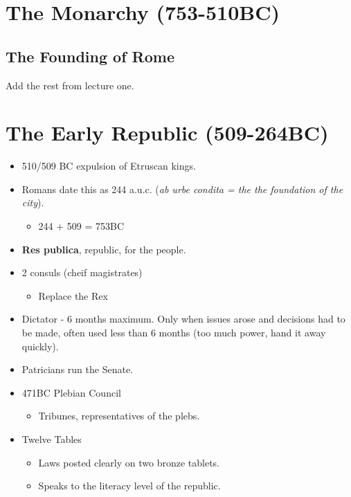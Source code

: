 \documentclass[12pt, twoside]{article}
\begin{document}
\section{The Monarchy (753-510BC)}
\subsection{The Founding of Rome}

Add the rest from lecture one.


\section{The Early Republic (509-264BC)}
\begin{itemize}
\item 510/509 BC expulsion of Etruscan kings.
\item Romans date this as 244 a.u.c. (\emph{ab urbe condita = the the foundation of the city}).
	\begin{itemize}
	\item 244 + 509 = 753BC
	\end{itemize}
\item \textbf{Res publica}, republic, for the people.
\item 2 consuls (cheif magistrates)
	\begin{itemize}
	\item Replace the Rex
	\end{itemize}
\item Dictator - 6 months maximum.  Only when issues arose and decisions had to be made, often used less than 6 months (too much power, hand it away quickly).
\item Patricians run the Senate.
\item 471BC Plebian Council
	\begin{itemize}
	\item Tribunes, representatives of the plebs.
	\end{itemize}
\item Twelve Tables
	\begin{itemize}
	\item Laws posted clearly on two bronze tablets.
	\item Speaks to the literacy level of the republic.
	\end{itemize}
\end{itemize}
\end{document}

